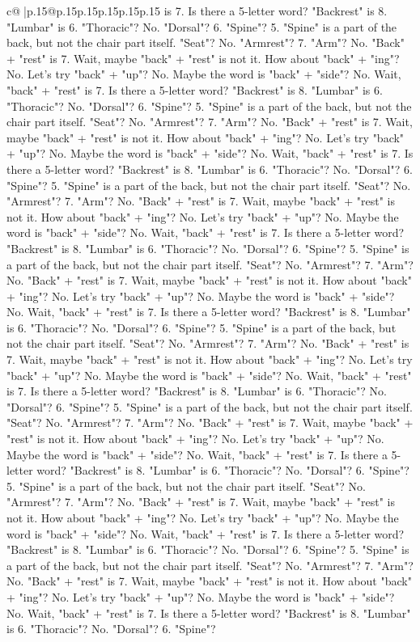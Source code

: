 \documentclass{article}
\begin{document}
{\begin{supertabular}{c@{$\;$}|p{.15\linewidth}@{}p{.15\linewidth}p{.15\linewidth}p{.15\linewidth}p{.15\linewidth}p{.15\linewidth}}
{{{is 7. Is there a 5{-}letter word? "Backrest" is 8. "Lumbar" is 6. "Thoracic"? No. "Dorsal"? 6. "Spine"? 5. "Spine" is a part of the back, but not the chair part itself. "Seat"? No. "Armrest"? 7. "Arm"? No. "Back" + "rest" is 7. Wait, maybe "back" + "rest" is not it. How about "back" + "ing"? No. Let's try "back" + "up"? No. Maybe the word is "back" + "side"? No. Wait, "back" + "rest" is 7. Is there a 5{-}letter word? "Backrest" is 8. "Lumbar" is 6. "Thoracic"? No. "Dorsal"? 6. "Spine"? 5. "Spine" is a part of the back, but not the chair part itself. "Seat"? No. "Armrest"? 7. "Arm"? No. "Back" + "rest" is 7. Wait, maybe "back" + "rest" is not it. How about "back" + "ing"? No. Let's try "back" + "up"? No. Maybe the word is "back" + "side"? No. Wait, "back" + "rest" is 7. Is there a 5{-}letter word? "Backrest" is 8. "Lumbar" is 6. "Thoracic"? No. "Dorsal"? 6. "Spine"? 5. "Spine" is a part of the back, but not the chair part itself. "Seat"? No. "Armrest"? 7. "Arm"? No. "Back" + "rest" is 7. Wait, maybe "back" + "rest" is not it. How about "back" + "ing"? No. Let's try "back" + "up"? No. Maybe the word is "back" + "side"? No. Wait, "back" + "rest" is 7. Is there a 5{-}letter word? "Backrest" is 8. "Lumbar" is 6. "Thoracic"? No. "Dorsal"? 6. "Spine"? 5. "Spine" is a part of the back, but not the chair part itself. "Seat"? No. "Armrest"? 7. "Arm"? No. "Back" + "rest" is 7. Wait, maybe "back" + "rest" is not it. How about "back" + "ing"? No. Let's try "back" + "up"? No. Maybe the word is "back" + "side"? No. Wait, "back" + "rest" is 7. Is there a 5{-}letter word? "Backrest" is 8. "Lumbar" is 6. "Thoracic"? No. "Dorsal"? 6. "Spine"? 5. "Spine" is a part of the back, but not the chair part itself. "Seat"? No. "Armrest"? 7. "Arm"? No. "Back" + "rest" is 7. Wait, maybe "back" + "rest" is not it. How about "back" + "ing"? No. Let's try "back" + "up"? No. Maybe the word is "back" + "side"? No. Wait, "back" + "rest" is 7. Is there a 5{-}letter word? "Backrest" is 8. "Lumbar" is 6. "Thoracic"? No. "Dorsal"? 6. "Spine"? 5. "Spine" is a part of the back, but not the chair part itself. "Seat"? No. "Armrest"? 7. "Arm"? No. "Back" + "rest" is 7. Wait, maybe "back" + "rest" is not it. How about "back" + "ing"? No. Let's try "back" + "up"? No. Maybe the word is "back" + "side"? No. Wait, "back" + "rest" is 7. Is there a 5{-}letter word? "Backrest" is 8. "Lumbar" is 6. "Thoracic"? No. "Dorsal"? 6. "Spine"? 5. "Spine" is a part of the back, but not the chair part itself. "Seat"? No. "Armrest"? 7. "Arm"? No. "Back" + "rest" is 7. Wait, maybe "back" + "rest" is not it. How about "back" + "ing"? No. Let's try "back" + "up"? No. Maybe the word is "back" + "side"? No. Wait, "back" + "rest" is 7. Is there a 5{-}letter word? "Backrest" is 8. "Lumbar" is 6. "Thoracic"? No. "Dorsal"? 6. "Spine"? 5. "Spine" is a part of the back, but not the chair part itself. "Seat"? No. "Armrest"? 7. "Arm"? No. "Back" + "rest" is 7. Wait, maybe "back" + "rest" is not it. How about "back" + "ing"? No. Let's try "back" + "up"? No. Maybe the word is "back" + "side"? No. Wait, "back" + "rest" is 7. Is there a 5{-}letter word? "Backrest" is 8. "Lumbar" is 6. "Thoracic"? No. "Dorsal"? 6. "Spine"? }}}
\end{supertabular}}
\end{document}
